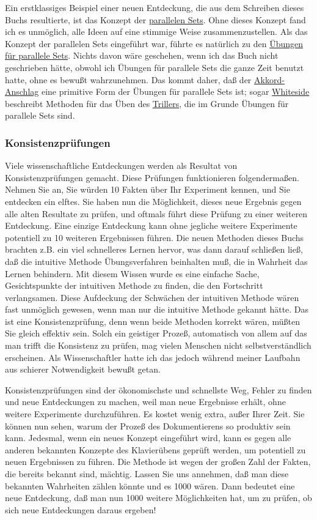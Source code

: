 Ein erstklassiges Beispiel einer neuen Entdeckung, die aus dem Schreiben dieses Buchs resultierte, ist das Konzept der \hyperref[c1ii11]{parallelen Sets}.
Ohne dieses Konzept fand ich es unmöglich, alle Ideen auf eine stimmige Weise zusammenzustellen.
Als das Konzept der parallelen Sets eingeführt war, führte es natürlich zu den \hyperref[c1iii7b]{Übungen für parallele Sets}.
Nichts davon wäre geschehen, wenn ich das Buch nicht geschrieben hätte, obwohl ich Übungen für parallele Sets die ganze Zeit benutzt hatte, ohne es bewußt wahrzunehmen.
Das kommt daher, daß der \hyperref[c1ii9]{Akkord-Anschlag} eine primitive Form der Übungen für parallele Sets ist; sogar \hyperref[Whiteside]{Whiteside} beschreibt Methoden für das Üben des \hyperref[c1iii3]{Trillers}, die im Grunde Übungen für parallele Sets sind.


\subsubsection{Konsistenzprüfungen}
\label{c3_3e}

Viele wissenschaftliche Entdeckungen werden als Resultat von Konsistenzprüfungen gemacht.
Diese Prüfungen funktionieren folgendermaßen.
Nehmen Sie an, Sie würden 10 Fakten über Ihr Experiment kennen, und Sie entdecken ein elftes.
Sie haben nun die Möglichkeit, dieses neue Ergebnis gegen alle alten Resultate zu prüfen, und oftmals führt diese Prüfung zu einer weiteren Entdeckung.
Eine einzige Entdeckung kann ohne jegliche weitere Experimente potentiell zu 10 weiteren Ergebnissen führen.
Die neuen Methoden dieses Buchs brachten z.B. ein viel schnelleres Lernen hervor, was dann darauf schließen ließ, daß die intuitive Methode Übungsverfahren beinhalten muß, die in Wahrheit das Lernen behindern.
Mit diesem Wissen wurde es eine einfache Sache, Gesichtspunkte der intuitiven Methode zu finden, die den Fortschritt verlangsamen.
Diese Aufdeckung der Schwächen der intuitiven Methode wären fast unmöglich gewesen, wenn man nur die intuitive Methode gekannt hätte.
Das ist eine Konsistenzprüfung, denn wenn beide Methoden korrekt wären, müßten Sie gleich effektiv sein.
Solch ein geistiger Prozeß, automatisch von allem auf das man trifft die Konsistenz zu prüfen, mag vielen Menschen nicht selbstverständlich erscheinen.
Als Wissenschaftler hatte ich das jedoch während meiner Laufbahn aus schierer Notwendigkeit bewußt getan.

Konsistenzprüfungen sind der ökonomischste und schnellste Weg, Fehler zu finden und neue Entdeckungen zu machen, weil man neue Ergebnisse erhält, ohne weitere Experimente durchzuführen.
Es kostet wenig extra, außer Ihrer Zeit.
Sie können nun sehen, warum der Prozeß des Dokumentierens so produktiv sein kann.
Jedesmal, wenn ein neues Konzept eingeführt wird, kann es gegen alle anderen bekannten Konzepte des Klavierübens geprüft werden, um potentiell zu neuen Ergebnissen zu führen.
Die Methode ist wegen der großen Zahl der Fakten, die bereits bekannt sind, mächtig.
Lassen Sie uns annehmen, daß man diese bekannten Wahrheiten zählen könnte und es 1000 wären.
Dann bedeutet eine neue Entdeckung, daß man nun 1000 weitere Möglichkeiten hat, um zu prüfen, ob sich neue Entdeckungen daraus ergeben!

